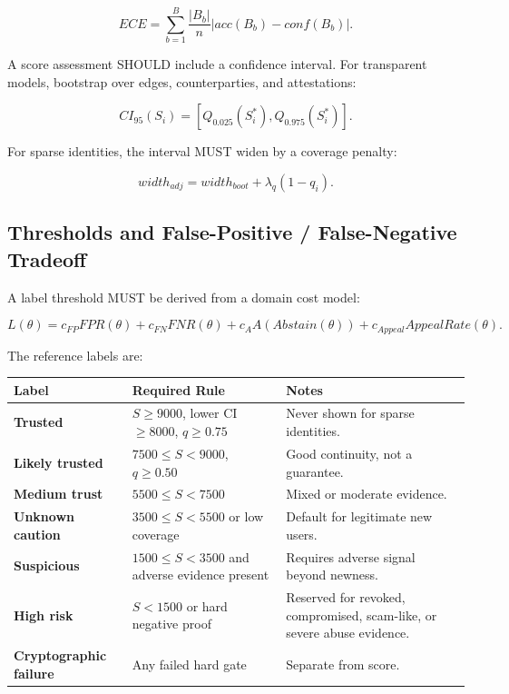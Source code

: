\documentclass[11pt]{article}
\begin{document}
\begin{equation}
ECE=\sum_{b=1}^{B}\frac{|B_b|}{n}\left|acc(B_b)-conf(B_b)\right|.
\end{equation}

A score assessment SHOULD include a confidence interval. For transparent models, bootstrap over edges, counterparties, and attestations:

\begin{equation}
CI_{95}(S_i)=\left[Q_{0.025}(S_i^*),Q_{0.975}(S_i^*)\right].
\end{equation}

For sparse identities, the interval MUST widen by a coverage penalty:

\begin{equation}
width_{adj}=width_{boot}+\lambda_q(1-q_i).
\end{equation}

\subsection{Thresholds and False-Positive / False-Negative Tradeoff}

A label threshold MUST be derived from a domain cost model:

\begin{equation}
L(\theta)=c_{FP}FPR(\theta)+c_{FN}FNR(\theta)+c_AA(Abstain(\theta))+c_{Appeal}AppealRate(\theta).
\end{equation}

The reference labels are:

\begin{center}
\begin{tabularx}{\textwidth}{>{\bfseries}p{} p{} X}
\toprule
Label & Required Rule & Notes \\
\midrule
Trusted & \(S\geq9000\), lower CI \(\geq8000\), \(q\geq0.75\) & Never shown for sparse identities. \\
Likely trusted & \(7500\leq S<9000\), \(q\geq0.50\) & Good continuity, not a guarantee. \\
Medium trust & \(5500\leq S<7500\) & Mixed or moderate evidence. \\
Unknown caution & \(3500\leq S<5500\) or low coverage & Default for legitimate new users. \\
Suspicious & \(1500\leq S<3500\) and adverse evidence present & Requires adverse signal beyond newness. \\
High risk & \(S<1500\) or hard negative proof & Reserved for revoked, compromised, scam-like, or severe abuse evidence. \\
Cryptographic failure & Any failed hard gate & Separate from score. \\
\bottomrule
\end{tabularx}
\end{center}
\end{document}
